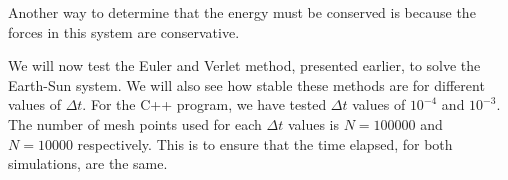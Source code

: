 \documentclass[12pt]{article}
\begin{document}
Another way to determine that the energy must be conserved is because the forces in this system are conservative.


We will now test the Euler and Verlet method, presented earlier, to solve the Earth-Sun system. We will also see how stable these methods are for different values of $\Delta t$. For the C++ program, we have tested $\Delta t$ values of $10^{-4}$ and $10^{-3}$. The number of mesh points used for each $\Delta t$ values is $N = 100 000$ and $N=10 000$ respectively. This is to ensure that the time elapsed, for both simulations, are the same.
\end{document}
